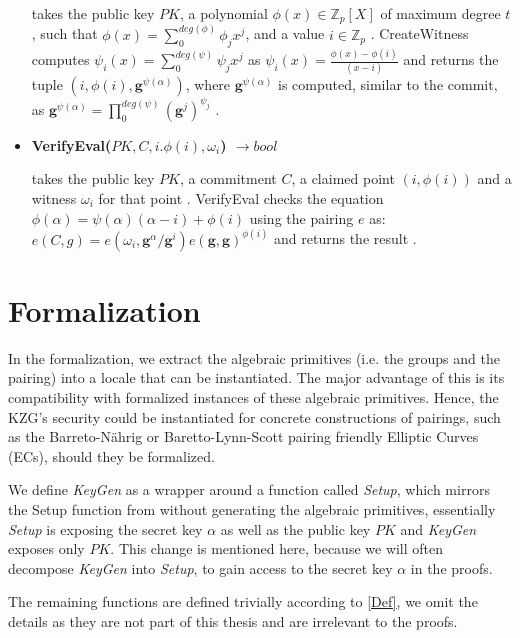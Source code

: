 \begin{itemize}
    takes the public key $PK$, a polynomial $\phi(x) \in \mathbb{Z}_p[X]$ of maximum degree $t$, such that $\phi(x)=\sum_{0}^{deg(\phi)}\phi_jx^j$, and a value $i\in\mathbb{Z}_p$ \parencite{KZG}. CreateWitness computes $\psi_i(x)=\sum_{0}^{deg(\psi)}\psi_jx^j$ as $\psi_i(x)=\frac{\phi(x)-\phi(i)}{(x-i)}$ and returns the tuple $(i,\phi(i),\mathbf{g}^{\psi(\alpha)})$, where $\mathbf{g}^{\psi(\alpha)}$ is computed, similar to the commit, as $\mathbf{g}^{\psi(\alpha)} = \prod_{0}^{deg(\psi)}(\mathbf{g}^j)^{\psi_j}$ \parencite{KZG}.
    \item \textbf{VerifyEval($PK,C,i.\phi(i),\omega_i$) $\rightarrow bool$}

    takes the public key $PK$, a commitment $C$, a claimed point $(i,\phi(i))$ and a witness $\omega_i$ for that point \parencite{KZG}. VerifyEval checks the equation $\phi(\alpha)=\psi(\alpha)(\alpha-i)+\phi(i)$ using the pairing $e$ as: $e(C,g) = e(\omega_i,\mathbf{g}^\alpha/\mathbf{g}^i)e(\mathbf{g},\mathbf{g})^{\phi(i)}$ and returns the result \parencite{KZG}.
\end{itemize}

\section*{Formalization}

In the formalization, we extract the algebraic primitives (i.e. the groups and the pairing) into a locale that can be instantiated. The major advantage of this is its compatibility with formalized instances of these algebraic primitives. Hence, the KZG's security could be instantiated for concrete constructions of pairings, such as the Barreto-Nährig\parencite{BN-EC} or Baretto-Lynn-Scott\parencite{BLS-EC} pairing friendly Elliptic Curves (ECs), should they be formalized.

We define \textit{KeyGen} as a wrapper around a function called \textit{Setup}, which mirrors the Setup function from \parencite{KZG} without generating the algebraic primitives, essentially \textit{Setup} is exposing the secret key $\alpha$ as well as the public key $PK$ and \textit{KeyGen} exposes only $PK$. This change is mentioned here, because we will often decompose \textit{KeyGen} into \textit{Setup}, to gain access to the secret key $\alpha$ in the proofs.

The remaining functions are defined trivially according to \ref{Def}, we omit the details as they are not part of this thesis and are irrelevant to the proofs.